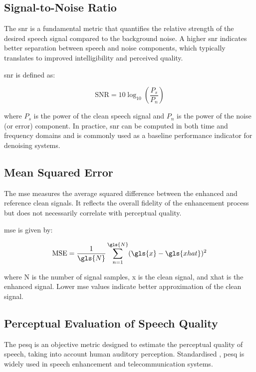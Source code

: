 \subsection{Signal-to-Noise Ratio}
\label{subsec:snr}

The \gls{snr} is a fundamental metric that quantifies the relative strength of the desired speech signal compared to the background noise. A higher \gls{snr} indicates better separation between speech and noise components, which typically translates to improved intelligibility and perceived quality.

\gls{snr} is defined as:

\begin{equation}
    \text{SNR} = 10 \log_{10} \left( \frac{P_s}{P_n} \right)
\end{equation}

where \( P_s \) is the power of the clean speech signal and \( P_n \) is the power of the noise (or error) component. In practice, \gls{snr} can be computed in both time and frequency domains and is commonly used as a baseline performance indicator for denoising systems.

\subsection{Mean Squared Error}
\label{subsec:mse}

The \gls{mse} measures the average squared difference between the enhanced and reference clean signals. It reflects the overall fidelity of the enhancement process but does not necessarily correlate with perceptual quality.

\gls{mse} is given by:

\begin{equation}
    \text{MSE} = \frac{1}{\gls{N}} \sum_{n=1}^{\gls{N}} (\gls{x} - \gls{xhat})^2
\end{equation}

where \gls{N} is the number of signal samples, \gls{x} is the clean signal, and \gls{xhat} is the enhanced signal. Lower \gls{mse} values indicate better approximation of the clean signal.

\subsection{Perceptual Evaluation of Speech Quality}
\label{subsec:pesq}

The \gls{pesq} is an objective metric designed to estimate the perceptual quality of speech, taking into account human auditory perception. Standardised \cite{rix2001perceptual}, \gls{pesq} is widely used in speech enhancement and telecommunication systems.

